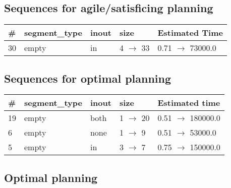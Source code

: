 \documentclass{article}
\begin{document}
                         \subsection*{Sequences for agile/satisficing planning}

                        \begin{center}
                        \begin{tabular}{@{}l|l|l|l|l@{}}
                        \# & segment\_type & inout & size & Estimated Time\\\midrule
                        30&empty&in&4 $\rightarrow$ 33&0.71 $\rightarrow$ 73000.0
                        \end{tabular}
                        \end{center}
                    
                            \subsection*{Sequences for optimal planning}

                            \begin{center}
                            \begin{tabular}{@{}l|l|l|l|l@{}}
                            \# & segment\_type & inout & size & Estimated time\\\midrule
                            19&empty&both&1 $\rightarrow$ 20&0.51 $\rightarrow$ 180000.0\\
6&empty&none&1 $\rightarrow$ 9&0.51 $\rightarrow$ 53000.0\\
5&empty&in&3 $\rightarrow$ 7&0.75 $\rightarrow$ 150000.0
                            \end{tabular}
                            \end{center}
                    
                                \subsection*{Optimal planning}
                                
\end{document}
